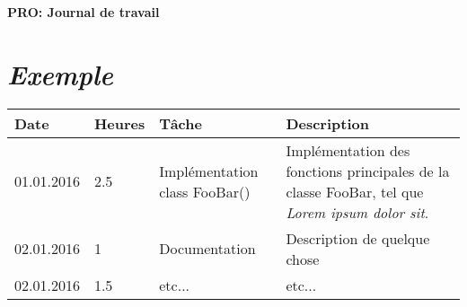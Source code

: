 \documentclass[french]{article}
\begin{document}
	\centering
	\large{\textbf{PRO: Journal de travail}}
	
	\justify
	
	\section*{\huge \textit{Exemple}}
	\begin{longtable}{p{}|p{}|p{}|p{}}
		Date&Heures&Tâche&Description\\
		\hline
		01.01.2016&2.5&Implémentation class FooBar()&Implémentation des fonctions principales de la classe FooBar, tel que \textit{Lorem ipsum dolor sit}.\\
		\hline
		02.01.2016&1&Documentation&Description de quelque chose\\
		\hline
		02.01.2016&1.5&etc...&etc...
	\end{longtable}
	
\end{document}
